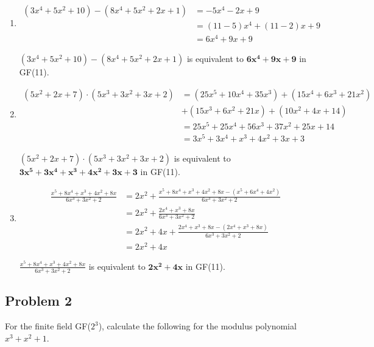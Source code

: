 \documentclass[11pt]{article}
\begin{document}
\begin{enumerate}[label=(\alph*)]
\item
\[
	\begin{split}
		(3x^4 + 5x^2 + 10) - (8x^4 + 5x^2 + 2x + 1) &= -5x^4 - 2x + 9
		\\
		&= (11-5)x^4 + (11-2)x + 9
		\\
		&= 6x^4 + 9x + 9
	\end{split}
\]

$(3x^4 + 5x^2 + 10) - (8x^4 + 5x^2 + 2x + 1)$ is equivalent to $\mathbf{6x^4 + 9x + 9}$ in GF(11).

\item
\[
	\begin{split}
		(5x^2 + 2x + 7) \cdot (5x^3 + 3x^2 + 3x + 2) &= (25x^5 + 10x^4 + 35x^3) + (15x^4 + 6x^3 + 21x^2)
		\\
		&+ (15x^3 + 6x^2 + 21x) + (10x^2 + 4x + 14)
		\\
		&= 25x^5 + 25x^4 + 56x^3 + 37x^2 + 25x + 14
		\\
		&= 3x^5 + 3x^4 + x^3 + 4x^2 + 3x + 3
	\end{split}
\]

$(5x^2 + 2x + 7) \cdot (5x^3 + 3x^2 + 3x + 2)$ is equivalent to $\mathbf{3x^5 + 3x^4 + x^3 + 4x^2 + 3x + 3}$ in GF(11).

\item
\[
	\begin{split}
		\displaystyle{\frac{x^5 + 8x^4 + x^3 + 4x^2 + 8x}{6x^3 + 3x^2 + 2}} &= \displaystyle{2x^2 + \frac{x^5 + 8x^4 + x^3 + 4x^2 + 8x - (x^5 + 6x^4 + 4x^2)}{6x^3 + 3x^2 + 2}}
		\\
		&= \displaystyle{2x^2 + \frac{2x^4 + x^3 + 8x}{6x^3 + 3x^2 + 2}}
		\\
		&= \displaystyle{2x^2 + 4x + \frac{2x^4 + x^3 + 8x - (2x^4 + x^3 + 8x)}{6x^3 + 3x^2 + 2}}
		\\
		&= 2x^2 + 4x
	\end{split}
\]

$\displaystyle{\frac{x^5 + 8x^4 + x^3 + 4x^2 + 8x}{6x^3 + 3x^2 + 2}}$ is equivalent to $\mathbf{2x^2 + 4x}$ in GF(11).

\end{enumerate}

\pagebreak

\subsection{Problem 2}
For the finite field GF($2^3$), calculate the following for the modulus polynomial $x^3+x^2+1$.
\end{document}
